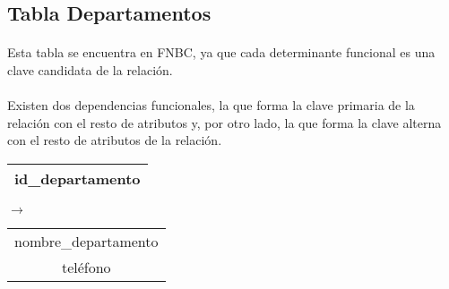 \subsection{Tabla Departamentos}

  \paragraph{}Esta tabla se encuentra en FNBC, ya que cada determinante
  funcional es una clave candidata de la relación.

  \paragraph{}Existen dos dependencias funcionales, la que forma la clave
  primaria de la relación con el resto de atributos y, por otro lado, la que
  forma la clave alterna con el resto de atributos de la relación.

  \begin{center}
    \begin{minipage}{4.4cm}{\begin{flushright}\begin{tabular}{ | c | }
                  \hline
                  id\_departamento \\
                  \hline
                 \end{tabular}\end{flushright} }
    \end{minipage}
    \begin{minipage}{0.8cm}{$\longrightarrow$}
    \end{minipage}
    \begin{minipage}{5.9cm}{\begin{tabular}{ | c | }
                  \hline
                  nombre\_departamento \\
                  teléfono \\
                  \hline
                 \end{tabular} }
    \end{minipage}
  \end{center}

